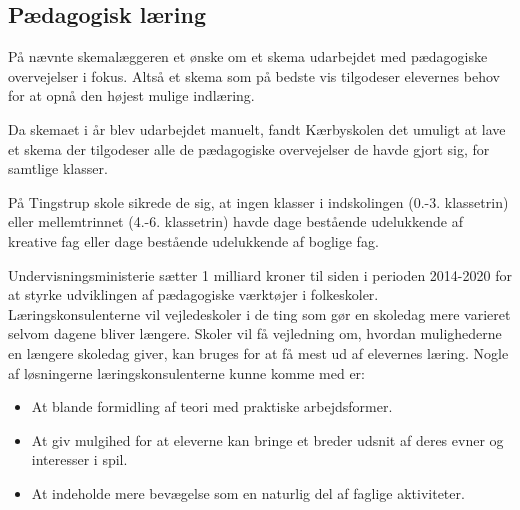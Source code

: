 \subsection{Pædagogisk læring}
\label{paedagogisk_laering}
På \school nævnte skemalæggeren et ønske om et skema udarbejdet med pædagogiske overvejelser i fokus. Altså et skema som på bedste vis tilgodeser elevernes behov for at opnå den højest mulige indlæring.

Da skemaet i år blev udarbejdet manuelt, fandt Kærbyskolen det umuligt at lave et skema der tilgodeser alle de pædagogiske overvejelser de havde gjort sig, for samtlige klasser\cite{interview_Kaerby}.

På Tingstrup skole sikrede de sig, at ingen klasser i indskolingen (0.-3. klassetrin) eller mellemtrinnet (4.-6. klassetrin) havde dage bestående udelukkende af kreative fag eller dage bestående udelukkende af boglige fag. 

Undervisningsministerie sætter 1 milliard kroner til siden i perioden 2014-2020 for at styrke udviklingen af pædagogiske værktøjer i folkeskoler. Læringskonsulenterne vil vejledeskoler i de ting som gør en skoledag mere varieret selvom dagene bliver længere. Skoler vil få vejledning om, hvordan mulighederne en længere skoledag giver, kan bruges for at få mest ud af elevernes læring. Nogle af løsningerne læringskonsulenterne kunne komme med er:
\begin{itemize}
\item At blande formidling af teori med praktiske arbejdsformer.
\item At giv mulgihed for at eleverne kan bringe et breder udsnit af deres evner og interesser i spil.
\item At indeholde mere bevægelse som en naturlig del af faglige aktiviteter\cite{Paedagogisklaering}.

\end{itemize}
